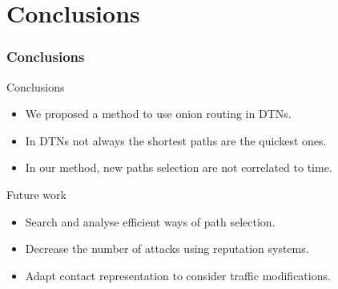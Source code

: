 \documentclass[compress,red]{beamer}
\begin{document}
\section{Conclusions}
\begin{frame}
\frametitle{Conclusions}
\begin{block}{Conclusions}
\begin{itemize}
\item We proposed a method to use onion routing in DTNs.
\item In DTNs not always the shortest paths are the quickest ones.
\item In our method, new paths selection are not correlated to time.
\end{itemize}
\end{block}
\bigskip
\begin{block}{Future work}
\begin{itemize}
\item Search and analyse efficient ways of path selection.
\item Decrease the number of attacks using reputation systems.
\item Adapt contact representation to consider traffic modifications. %
\end{itemize}
\end{block}
\end{frame}
\end{document}
